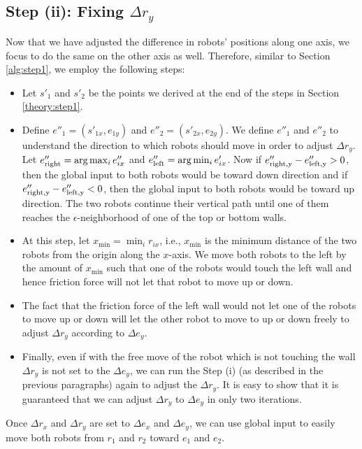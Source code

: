 \subsection{Step (ii): Fixing $\Delta r_y$}
Now that we have adjusted the difference in robots' positions along one axis, we focus to do the same on the other axis as well. Therefore, similar to Section \ref{alg:step1}, we employ the following steps:
\begin{itemize}
\item Let $s'_1$ and $s'_2$ be the points we derived at the end of the steps in Section \ref{theory:step1}. 
\item Define $e''_1=(s'_{1x},e_{1y})$ and $e''_2=(s'_{2x},e_{2y})$. We define $e''_1$ and $e''_2$ to understand the direction to which robots should move in order to adjust $\Delta r_y$. Let $e''_{\rm{right}} = \arg \max_i e''_{ix}$ and $e''_{\rm{left}} = \arg \min_i e'_{ix}$. Now if $e''_{\rm{right},y}-e''_{\rm{left},y}>0$, then the global input to both robots would be toward down direction and if $e''_{\rm{right},y}-e''_{\rm{left},y}<0$, then the global input to both robots would be toward up direction. The two robots continue their vertical path until one of them reaches the $\epsilon$-neighborhood of one of the top or bottom walls.
\item At this step, let $x_{\min} = \min_i r_{ix}$, i.e., $x_{\min}$ is the minimum distance of the two robots from the origin along the $x$-axis. We move both robots to the left by the amount of $x_{\min}$ such that one of the robots would touch the left wall and hence friction force will not let that robot to move up or down.
\item The fact that the friction force of the left wall would not let one of the robots to move up or down will let the other robot to move to up or down freely to adjust $\Delta r_y $ according to $\Delta e_y$.
\item Finally, even if with the free move of the robot which is not touching the wall  $\Delta r_y$ is not set to the $\Delta e_y$, we can run the Step (i) (as described in the previous paragraphs) again to adjust the $\Delta r_y$. It is easy to show that it is guaranteed that we can adjust $\Delta r_y$ to $\Delta e_y$ in only two iterations.
\end{itemize}
Once $\Delta r_x$ and $\Delta r_y$ are set to $\Delta e_x$ and $\Delta e_y$, we can use global input to easily move both robots from $r_1$ and $r_2$ toward $e_1$ and $e_2$. 






